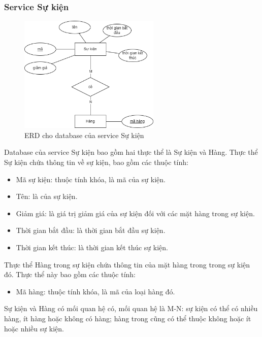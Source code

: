 \subsubsection{Service Sự kiện}
\begin{figure}[!htp]
	\begin{center}
		\includegraphics[width=0.6\textwidth]{img/database/erd/eerd-event.png}
		\newline
		\caption{ERD cho database của service Sự kiện}
	\end{center}
\end{figure}

\par Database của service Sự kiện bao gồm hai thực thể là Sự kiện và Hàng. Thực thể Sự kiện chứa thông tin về sự kiện, bao gồm các thuộc tính:
\begin{itemize}
	\item Mã sự kiện: thuộc tính khóa, là mã của sự kiện.
	\item Tên: là của sự kiện.
	\item Giảm giá: là giá trị giảm giá của sự kiện đối với các mặt hàng trong sự kiện.
	\item Thời gian bắt đầu: là thời gian bắt đầu sự kiện.
	\item Thời gian kết thúc: là thời gian kết thúc sự kiện.
\end{itemize}

\par Thực thể Hàng trong sự kiện chứa thông tin của mặt hàng trong trong sự kiện đó. Thực thể này bao gồm các thuộc tính:
\begin{itemize}
	\item Mã hàng: thuộc tính khóa, là mã của loại hàng đó.
\end{itemize}

\par Sự kiện và Hàng có mối quan hệ có, mối quan hệ là M-N: sự kiện có thể có nhiều hàng, ít hàng hoặc không có hàng; hàng trong cũng có thể thuộc không hoặc ít hoặc nhiều sự kiện.


